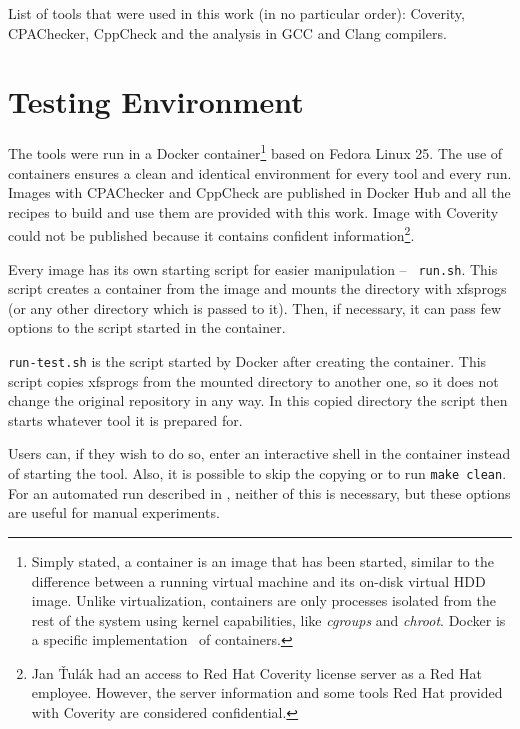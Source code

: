 List of tools that were used in this work (in no particular order): Coverity,
CPAChecker, CppCheck and the analysis in GCC and Clang compilers.


\section{Testing Environment}\label{chap:techniques:env}

The tools were run in a Docker container\footnote{Simply stated, a
	container is an image that has been started, similar to the
		difference between a running virtual machine and its
		on-disk virtual HDD image. Unlike virtualization,
		containers are only processes isolated from the rest of the
system using kernel capabilities, like {\em cgroups} and {\em chroot}.
Docker is a specific implementation~\cite{docker} of containers.} based on Fedora Linux
25. The use of containers ensures a clean and identical environment for
every tool and every run. Images with CPAChecker and CppCheck are published
in Docker Hub and all the recipes to build and use them are provided with
this work. Image with Coverity could not be published because it contains
confident information\footnote{Jan Ťulák had an access to Red Hat Coverity license
server as a Red Hat employee. However, the server information and some tools
	Red Hat provided with Coverity are considered confidential.}.


Every image has its own starting script for easier manipulation -- {\tt
run.sh}.  This script creates a container from the image and mounts the
directory with xfsprogs (or any other directory which is passed to it).
Then, if necessary, it can pass few options to the script started in
the container.

{\tt run-test.sh} is the script started by Docker after creating the container.
This script copies xfsprogs from the mounted directory to another one, so it
does not change the original repository in any way. In this copied directory
the script then starts whatever tool it is prepared for.

Users can, if they wish to do so, enter an interactive shell in the container
instead of starting the tool. Also, it is possible to skip the copying or to
run {\tt make clean}. For an automated run described in
, neither of this is necessary, but these
options are useful for manual experiments.


